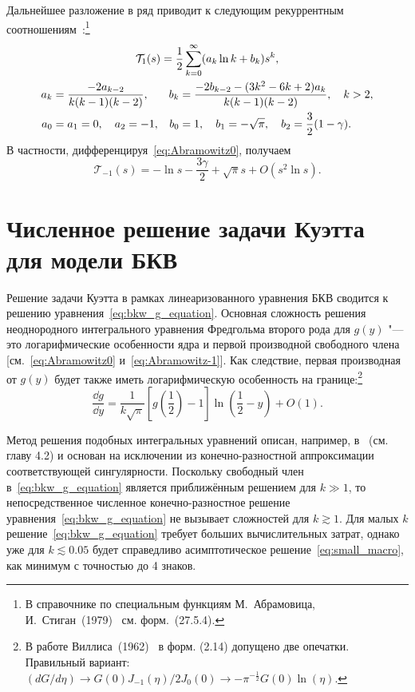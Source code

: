 Дальнейшее разложение в ряд приводит к следующим рекуррентным
соотношениям~\cite{Abramowitz1953,Abramowitz1972}:\footnote{
    В справочнике по специальным функциям М.~Абрамовица, И.~Стиган~(1979)~\cite{Abramowitz1972}
    см. форм.~(27.5.4).
}
\begin{gather}\label{eq:Abramowitz1-full}
    \mathcal{T}_1(s) = \frac12\sum_{k=0}^\infty ( a_k \ln{k} + b_k ) s^k, \\
    \begin{alignedat}{2}
        a_k &= \frac{-2a_{k-2}}{k(k-1)(k-2)}, &\quad b_k &= \frac{-2b_{k-2} - (3k^2-6k+2)a_k}{k(k-1)(k-2)}, \quad k>2, \\
        a_0 &= a_1 = 0, \quad a_2 = -1, &\quad b_0 &= 1, \quad b_1 = -\sqrt\pi, \quad b_2 = \frac32(1-\gamma).
    \end{alignedat} \notag
\end{gather}
В частности, дифференцируя~\eqref{eq:Abramowitz0}, получаем
\begin{equation}\label{eq:Abramowitz-1}
    \mathcal{T}_{-1}(s) = - \ln{s} - \frac{3\gamma}2 + \sqrt\pi s + O(s^2\ln{s}).
\end{equation}

\section{Численное решение задачи Куэтта для модели БКВ}\label{sec:numerical_bkw}

Решение задачи Куэтта в рамках линеаризованного уравнения БКВ
сводится к решению уравнения~\eqref{eq:bkw_g_equation}.
Основная сложность решения неоднородного интегрального уравнения Фредгольма второго рода для \(g(y)\)
"--- это логарифмические особенности ядра и первой производной свободного члена
[см.~\eqref{eq:Abramowitz0} и~\eqref{eq:Abramowitz-1}].
Как следствие, первая производная от \(g(y)\)
будет также иметь логарифмическую особенность на границе:\footnote{
    В работе Виллиса~(1962)~\cite{Willis1962} в форм. (2.14) допущено две опечатки.
    Правильный вариант: \( (dG/d\eta) \to G(0)J_{-1}(\eta)/2J_0(0) \to -\pi^{-\frac12}G(0)\ln(\eta)\).
}
\begin{equation}
    \frac{\dd{g}}{\dd{y}} = \frac1{k\sqrt\pi}\left[g\left(\frac12\right)-1\right]\ln\left(\frac12-y\right) + O(1).
\end{equation}

Метод решения подобных интегральных уравнений описан, например, в~\cite{Atkinson1997}
(см. главу 4.2) и основан на исключении из конечно-разностной аппроксимации
соответствующей сингулярности.
Поскольку свободный член в~\eqref{eq:bkw_g_equation} является приближённым решением для \(k\gg1\),
то непосредственное численное конечно-разностное решение уравнения~\eqref{eq:bkw_g_equation}
не вызывает сложностей для \(k\gtrsim1\). Для малых \(k\) решение~\eqref{eq:bkw_g_equation}
требует больших вычислительных затрат, однако уже для \(k \lesssim 0.05\) будет справедливо
асимптотическое решение~\eqref{eq:small_macro}, как минимум с точностью до 4 знаков.
